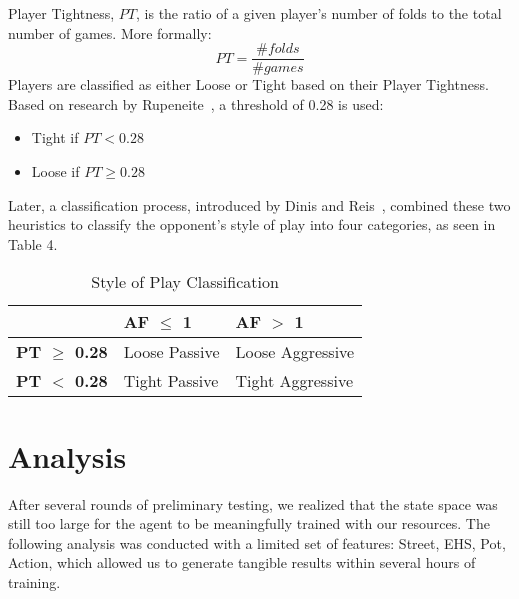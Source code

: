 \documentclass{article}
\begin{document}
Player Tightness, $PT$, is the ratio of a given player's number of folds to the total number of games. More formally:
\begin{displaymath}
  PT =  \frac{\text{\# }folds}{\text{\# }games} 
\end{displaymath}
\noindent Players are classified as either Loose or Tight based on their Player Tightness. Based on research by Rupeneite~, a threshold of 0.28 is used:
\begin{itemize}
	\item Tight if $PT < 0.28$
	\item Loose if $PT \geq 0.28$
\end{itemize}

Later, a classification process, introduced by Dinis and Reis~, combined these two heuristics to classify the opponent's style of play into four categories, as seen in Table 4.

\begin{table}[h!]
  \begin{center}
    \begin{tabular}{p{1.5cm}|p{2cm}|p{2cm}}
      \textbf{} & \textbf{AF $\leq$ 1} & \textbf{AF $>$ 1} \\
      \hline
      \textbf{PT $\geq$ 0.28} & Loose \newline Passive & Loose \newline Aggressive \\
      \hline
      \textbf{PT $<$ 0.28} & Tight \newline Passive & Tight \newline Aggressive \\
    \end{tabular}
    \caption{Style of Play Classification}
    \label{tab:table4}
  \end{center}
\end{table}

\section{Analysis}

After several rounds of preliminary testing, we realized that the state space was still too large for the agent to be meaningfully trained with our resources. The following analysis was conducted with a limited set of features: Street, EHS, Pot, Action, which allowed us to generate tangible results within several hours of training.
\end{document}

